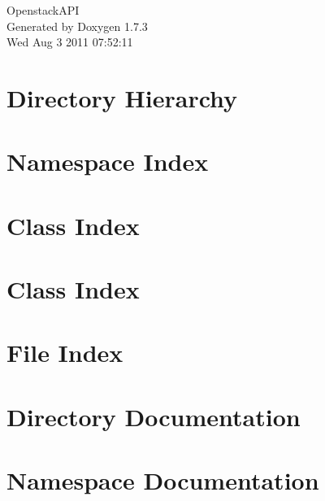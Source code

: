 \documentclass[a4paper]{book}
\begin{document}
\hypersetup{pageanchor=false}
\begin{titlepage}
\vspace*{7cm}
\begin{center}
{\Large OpenstackAPI }\\
\vspace*{1cm}
{\large Generated by Doxygen 1.7.3}\\
\vspace*{0.5cm}
{\small Wed Aug 3 2011 07:52:11}\\
\end{center}
\end{titlepage}
\clearemptydoublepage
{}
\tableofcontents
\clearemptydoublepage
{}
\hypersetup{pageanchor=true}
\chapter{Directory Hierarchy}

\chapter{Namespace Index}

\chapter{Class Index}

\chapter{Class Index}

\chapter{File Index}

\chapter{Directory Documentation}









\chapter{Namespace Documentation}



\end{document}
